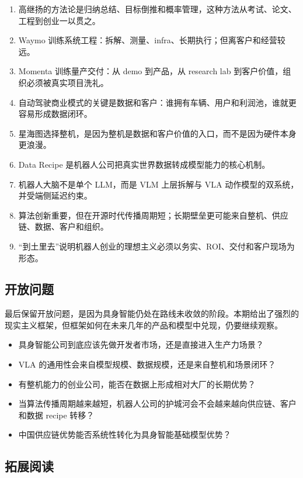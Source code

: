 \documentclass[a4paper]{article}
\begin{document}
\begin{enumerate}
\item 高继扬的方法论是归纳总结、目标倒推和概率管理，这种方法从考试、论文、工程到创业一以贯之。
\item Waymo 训练系统工程：拆解、测量、infra、长期执行；但离客户和经营较远。
\item Momenta 训练量产交付：从 demo 到产品，从 research lab 到客户价值，组织必须被真实项目洗礼。
\item 自动驾驶商业模式的关键是数据和客户：谁拥有车辆、用户和利润池，谁就更容易形成数据闭环。
\item 星海图选择整机，是因为整机是数据和客户价值的入口，而不是因为硬件本身更浪漫。
\item Data Recipe 是机器人公司把真实世界数据转成模型能力的核心机制。
\item 机器人大脑不是单个 LLM，而是 VLM 上层拆解与 VLA 动作模型的双系统，并受端侧延迟约束。
\item 算法创新重要，但在开源时代传播周期短；长期壁垒更可能来自整机、供应链、数据、客户和组织。
\item “到土里去”说明机器人创业的理想主义必须以务实、ROI、交付和客户现场为形态。
\end{enumerate}

\subsection{开放问题}

最后保留开放问题，是因为具身智能仍处在路线未收敛的阶段。本期给出了强烈的现实主义框架，但框架如何在未来几年的产品和模型中兑现，仍要继续观察。

\begin{itemize}
\item 具身智能公司到底应该先做开发者市场，还是直接进入生产力场景？
\item VLA 的通用性会来自模型规模、数据规模，还是来自整机和场景闭环？
\item 有整机能力的创业公司，能否在数据上形成相对大厂的长期优势？
\item 当算法传播周期越来越短，机器人公司的护城河会不会越来越向供应链、客户和数据 recipe 转移？
\item 中国供应链优势能否系统性转化为具身智能基础模型优势？
\end{itemize}

\subsection{拓展阅读}
\end{document}
